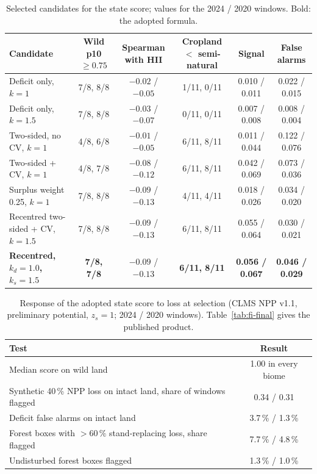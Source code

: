 \documentclass[11pt,a4paper]{article}
\begin{document}
\begin{table}[H]
\centering\footnotesize
\caption{Selected candidates for the state score; values for the 2024 / 2020 windows. Bold: the
adopted formula.}
\label{tab:fi-candidates}
\setlength{\tabcolsep}{3pt}
\begin{tabularx}{\textwidth}{Lccccc}
\toprule
Candidate & Wild p10 $\ge 0.75$ & Spearman with HII & Cropland $<$ semi-natural & Signal & False alarms \\
\midrule
Deficit only, $k = 1$ & 7/8, 8/8 & $-0.02$ / $-0.05$ & 1/11, 0/11 & 0.010 / 0.011 & 0.022 / 0.015 \\
Deficit only, $k = 1.5$ & 7/8, 8/8 & $-0.03$ / $-0.07$ & 0/11, 0/11 & 0.007 / 0.008 & 0.008 / 0.004 \\
Two-sided, no CV, $k = 1$ & 4/8, 6/8 & $-0.01$ / $-0.05$ & 6/11, 8/11 & 0.011 / 0.044 & 0.122 / 0.076 \\
Two-sided + CV, $k = 1$ & 4/8, 7/8 & $-0.08$ / $-0.12$ & 6/11, 8/11 & 0.042 / 0.069 & 0.073 / 0.036 \\
Surplus weight 0.25, $k = 1$ & 7/8, 8/8 & $-0.09$ / $-0.13$ & 4/11, 4/11 & 0.018 / 0.026 & 0.034 / 0.020 \\
Recentred two-sided + CV, $k = 1.5$ & 7/8, 8/8 & $-0.09$ / $-0.13$ & 6/11, 8/11 & 0.055 / 0.064 & 0.030 / 0.021 \\
\textbf{Recentred, $k_d = 1.0$, $k_s = 1.5$} & \textbf{7/8, 7/8} & $\mathbf{-0.09}$ / $\mathbf{-0.13}$ & \textbf{6/11, 8/11} & \textbf{0.056 / 0.067} & \textbf{0.046 / 0.029} \\
\bottomrule
\end{tabularx}
\end{table}

\begin{table}[H]
\centering\small
\caption{Response of the adopted state score to loss at selection (CLMS NPP v1.1, preliminary
potential, $z_s = 1$; 2024 / 2020 windows). Table~\ref{tab:fi-final} gives the published product.}
\begin{tabular}{lc}
\toprule
Test & Result \\
\midrule
Median score on wild land & 1.00 in every biome \\
Synthetic 40\,\% NPP loss on intact land, share of windows flagged & 0.34 / 0.31 \\
Deficit false alarms on intact land & 3.7\,\% / 1.3\,\% \\
Forest boxes with $>60\,\%$ stand-replacing loss, share flagged & 7.7\,\% / 4.8\,\% \\
Undisturbed forest boxes flagged & 1.3\,\% / 1.0\,\% \\
\bottomrule
\end{tabular}
\end{table}
\end{document}
